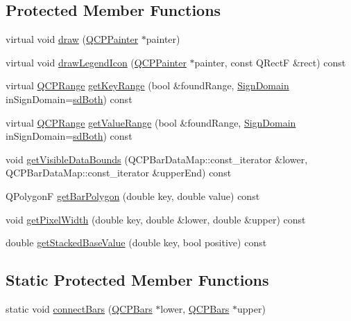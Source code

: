 \subsection*{Protected Member Functions}
\begin{DoxyCompactItemize}
\item 
virtual void \hyperlink{class_q_c_p_bars_a42b894e34dac799f90ff3700706b31df}{draw} (\hyperlink{class_q_c_p_painter}{Q\+C\+P\+Painter} $\ast$painter)
\item 
virtual void \hyperlink{class_q_c_p_bars_ad4fb35d2ab7d2aa460a6612aff3e7a15}{draw\+Legend\+Icon} (\hyperlink{class_q_c_p_painter}{Q\+C\+P\+Painter} $\ast$painter, const Q\+Rect\+F \&rect) const 
\item 
virtual \hyperlink{class_q_c_p_range}{Q\+C\+P\+Range} \hyperlink{class_q_c_p_bars_a93cfdc8a535f36aeb087acca49c00662}{get\+Key\+Range} (bool \&found\+Range, \hyperlink{class_q_c_p_abstract_plottable_a661743478a1d3c09d28ec2711d7653d8}{Sign\+Domain} in\+Sign\+Domain=\hyperlink{class_q_c_p_abstract_plottable_a661743478a1d3c09d28ec2711d7653d8a082b98cfb91a7363a3b5cd17b0c1cd60}{sd\+Both}) const 
\item 
virtual \hyperlink{class_q_c_p_range}{Q\+C\+P\+Range} \hyperlink{class_q_c_p_bars_ada96e20309570d1488c165596cb2647f}{get\+Value\+Range} (bool \&found\+Range, \hyperlink{class_q_c_p_abstract_plottable_a661743478a1d3c09d28ec2711d7653d8}{Sign\+Domain} in\+Sign\+Domain=\hyperlink{class_q_c_p_abstract_plottable_a661743478a1d3c09d28ec2711d7653d8a082b98cfb91a7363a3b5cd17b0c1cd60}{sd\+Both}) const 
\item 
void \hyperlink{class_q_c_p_bars_af73d2032be0a64d2692bb76b08c79ec2}{get\+Visible\+Data\+Bounds} (Q\+C\+P\+Bar\+Data\+Map\+::const\+\_\+iterator \&lower, Q\+C\+P\+Bar\+Data\+Map\+::const\+\_\+iterator \&upper\+End) const 
\item 
Q\+Polygon\+F \hyperlink{class_q_c_p_bars_a1d118a76662cfd691a78c6f573e3f78c}{get\+Bar\+Polygon} (double key, double value) const 
\item 
void \hyperlink{class_q_c_p_bars_a794eefe4fb29b9b40583654ccbf460dc}{get\+Pixel\+Width} (double key, double \&lower, double \&upper) const 
\item 
double \hyperlink{class_q_c_p_bars_ae9b0c2fad9f29030c84bb6e62a4b605f}{get\+Stacked\+Base\+Value} (double key, bool positive) const 
\end{DoxyCompactItemize}
\subsection*{Static Protected Member Functions}
\begin{DoxyCompactItemize}
\item 
static void \hyperlink{class_q_c_p_bars_a6ea37802cd22f97235cab614b14b9f19}{connect\+Bars} (\hyperlink{class_q_c_p_bars}{Q\+C\+P\+Bars} $\ast$lower, \hyperlink{class_q_c_p_bars}{Q\+C\+P\+Bars} $\ast$upper)
\end{DoxyCompactItemize}
